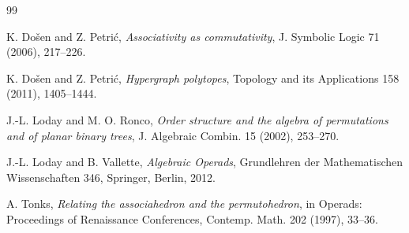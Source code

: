 \documentclass[a4paper]{article}
\theoremstyle{plain}
\theoremstyle{definition}
\theoremstyle{remark}
\numberwithin{equation}{section}
\begin{document}
\begin{thebibliography}{99}

K. Došen and Z. Petrić, \textit{Associativity as commutativity}, J. Symbolic Logic 71 (2006), 217--226.

K. Došen and Z. Petrić, \textit{Hypergraph polytopes}, Topology and its Applications 158 (2011), 1405--1444.

J.-L. Loday and M. O. Ronco, \textit{Order structure and the algebra of permutations and of planar binary trees}, J. Algebraic Combin. 15 (2002), 253--270.

J.-L. Loday and B. Vallette, \textit{Algebraic Operads}, Grundlehren der Mathematischen Wissenschaften 346, Springer, Berlin, 2012.

A. Tonks, \textit{Relating the associahedron and the permutohedron}, in Operads: Proceedings of Renaissance Conferences, Contemp. Math. 202 (1997), 33--36.


\end{thebibliography}
\end{document}
